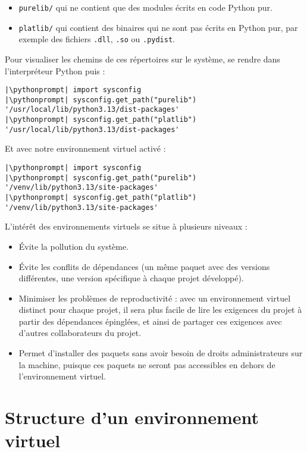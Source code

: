\begin{itemize}
    \item \texttt{purelib/} qui ne contient que des modules écrits en code Python pur.
    \item \texttt{platlib/} qui contient des binaires qui ne sont pas écrits en Python pur, par exemple des fichiers \texttt{.dll}, \texttt{.so} ou \texttt{.pydist}.
\end{itemize}
\medskip

Pour visualiser les chemins de ces répertoires sur le système, se rendre dans l'interpréteur Python puis :
\begin{lstlisting}[style=repl]
|\pythonprompt| import sysconfig
|\pythonprompt| sysconfig.get_path("purelib")
'/usr/local/lib/python3.13/dist-packages'
|\pythonprompt| sysconfig.get_path("platlib")
'/usr/local/lib/python3.13/dist-packages'
\end{lstlisting}

Et avec notre environnement virtuel activé :
\begin{lstlisting}[style=repl]
|\pythonprompt| import sysconfig
|\pythonprompt| sysconfig.get_path("purelib")
'/venv/lib/python3.13/site-packages'
|\pythonprompt| sysconfig.get_path("platlib")
'/venv/lib/python3.13/site-packages'
\end{lstlisting}

L'intérêt des environnements virtuels se situe à plusieurs niveaux :

\begin{itemize}
    \item Évite la pollution du système.
    \item Évite les conflits de dépendances (un même paquet avec des versions différentes, une version spécifique à chaque projet développé).
    \item Minimiser les problèmes de reproductivité : avec un environnement virtuel distinct pour chaque projet, il sera plus facile de lire les exigences du projet à partir des dépendances épinglées, et ainsi de partager ces exigences avec d'autres collaborateurs du projet.
    \item Permet d'installer des paquets sans avoir besoin de droits administrateurs sur la machine, puisque ces paquets ne seront pas accessibles en dehors de l'environnement virtuel.
\end{itemize}

\section{Structure d'un environnement virtuel}

